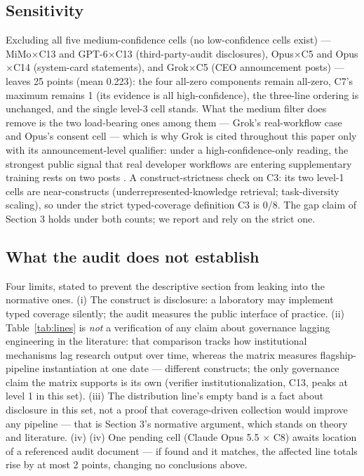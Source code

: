 \documentclass[10pt]{article}
\begin{document}
\subsection{Sensitivity}

Excluding all five medium-confidence cells (no low-confidence cells exist) --- MiMo$\times$C13 and GPT-6$\times$C13 (third-party-audit disclosures), Opus$\times$C5 and Opus$\times$C14 (system-card statements), and Grok$\times$C5 (CEO announcement posts) --- leaves 25 points (mean 0.223): the four all-zero components remain all-zero, C7's maximum remains 1 (its evidence is all high-confidence), the three-line ordering is unchanged, and the single level-3 cell stands. What the medium filter does remove is the two load-bearing ones among them --- Grok's real-workflow case and Opus's consent cell --- which is why Grok is cited throughout this paper only with its announcement-level qualifier: under a high-confidence-only reading, the strongest public signal that real developer workflows are entering supplementary training rests on two posts \cite{ref21}. A construct-strictness check on C3: its two level-1 cells are near-constructs (underrepresented-knowledge retrieval; task-diversity scaling), so under the strict typed-coverage definition C3 is 0/8. The gap claim of Section 3 holds under both counts; we report and rely on the strict one.

\subsection{What the audit does not establish}

Four limits, stated to prevent the descriptive section from leaking into the normative ones. (i) The construct is disclosure: a laboratory may implement typed coverage silently; the audit measures the public interface of practice. (ii) Table~\ref{tab:lines} is \emph{not} a verification of any claim about governance lagging engineering in the literature: that comparison tracks how institutional mechanisms lag research output over time, whereas the matrix measures flagship-pipeline instantiation at one date --- different constructs; the only governance claim the matrix supports is its own (verifier institutionalization, C13, peaks at level 1 in this set). (iii) The distribution line's empty band is a fact about disclosure in this set, not a proof that coverage-driven collection would improve any pipeline --- that is Section 3's normative argument, which stands on theory and literature. (iv) (iv) One pending cell (Claude Opus 5.5 $\times$ C8) awaits location of a referenced audit document --- if found and it matches, the affected line totals rise by at most 2 points, changing no conclusions above.
\end{document}
